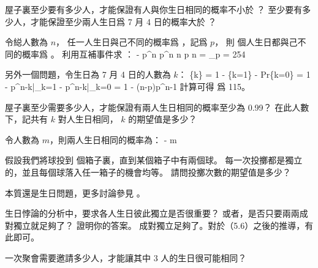 \startsection[
  title={Probabilistic analysis and further uses of indicator random variables},
]

\startEXERCISE
屋子裏至少要有多少人，才能保證有人與你生日相同的概率不小於 ？
至少要有多少人，才能保證至少兩人生日爲 7 月 4 日的概率大於 ？
\stopEXERCISE

\startANSWER
令縂人數為 $n$，
任一人生日與己不同的概率爲 ，記爲 $p$，
則  個人生日都與己不同的概率爲 。
利用互補事件求 ：
\startformula\startmathalignment
{} - p^n \NC \ge {} \NR
\NC p^n     \NC \le {} \NR
\NC n \lg p  \NC \ge \lg{} \NR
\NC n = \lceil \log_p \rceil \NC = 254 \NR
\stopmathalignment\stopformula

另外一個問題，令生日為 7 月 4 日的人數為 $k$：
\startformula\startmathalignment
\NC \Pr\{k\} \NC=
        1 - \Pr\{k=1\} - Pr\{k=0\} \NR
\NC \NC= 1 - p^{n-k}|_{k=1} - p^{n-k}|_{k=0} \NR
\NC \NC= 1 - (n-p)p^{n-1} \NR
\stopmathalignment\stopformula
計算可得  爲 115。
\stopANSWER

\startEXERCISE
屋子裏至少需要多少人，才能保證有兩人生日相同的概率至少為 0.99？
在此人數下，記共有 $k$ 對人生日相同， $k$ 的期望值是多少？
\stopEXERCISE

\startANSWER
令人數為 $m$，則兩人生日相同的概率為：
\startformula\startmathalignment
{} -  \NC {} \NR
\NC {} \NC {} \NR
\NC m \NC \le 
\stopmathalignment\stopformula
\stopANSWER

\startEXERCISE
假設我們將球投到  個箱子裏，直到某個箱子中有兩個球。
每一次投擲都是獨立的，並且每個球落入任一箱子的機會均等。
請問投擲次數的期望值是多少？
\stopEXERCISE

\startANSWER
本質還是生日問題，更多討論參見 。
\stopANSWER

\startEXERCISE \DIFFICULT
生日悖論的分析中，要求各人生日彼此獨立是否很重要？
或者，是否只要兩兩成對獨立就足夠了？
證明你的答案。
\stopEXERCISE
\startANSWER
成對獨立足夠了。對於（5.6）之後的推導，有此即可。
\stopANSWER

\startEXERCISE \DIFFICULT
一次聚會需要邀請多少人，才能讓其中 3 人的生日很可能相同？
\stopEXERCISE

